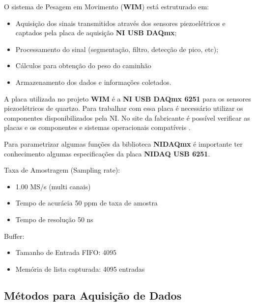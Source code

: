 \documentclass{ufscThesis}
\begin{document}
O sistema de Pesagem em Movimento (\textbf{WIM}) está estruturado em: 
\begin{itemize}
  \item Aquisição dos sinais transmitidos através dos sensores piezoelétricos e captados pela placa de aquisição \textbf{NI USB DAQmx};
  \item Processamento do sinal (segmentação, filtro, detecção de pico, etc);
  \item Cálculos para obtenção do peso do caminhão
  \item Armazenamento dos dados e informações coletados.
\end{itemize}

A placa utilizada no projeto \textbf{WIM} é a \textbf{NI USB DAQmx 6251} para os sensores piezoelétricos de quartzo. Para trabalhar com essa placa é necessário utilizar os componentes disponibilizados pela NI. No site da fabricante é possível verificar as placas e os componentes e sistemas operacionais compatíveis \cite{nidamx-portable-devices}. 

Para parametrizar algumas funções da biblioteca \textbf{NIDAQmx} é importante ter conhecimento algumas especificações da placa \textbf{NIDAQ USB 6251}.

\begin{description}
  \item Taxa de Amostragem (Sampling rate):
  \begin{itemize}
    \item 1.00 MS/s (multi canais)
    \item Tempo de acurácia 50 ppm de taxa de amostra
    \item Tempo de resolução 50 ns
  \end{itemize}
\end{description}

\begin{description}
  \item Buffer:
  \begin{itemize}
    \item Tamanho de Entrada FIFO: 4095
    \item Memória de lista capturada: 4095 entradas
  \end{itemize}
\end{description}


\subsection{Métodos para Aquisição de Dados}\label{metodo-aquisicao}
\end{document}
